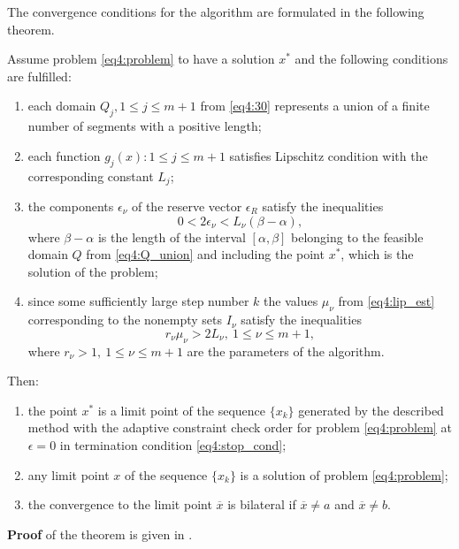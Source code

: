 The convergence conditions for the algorithm are formulated in the following theorem.

\begin{theorem}
Assume problem \eqref{eq4:problem} to have a solution $x^*$ and the following conditions are fulfilled:
\begin{enumerate}
  \item each domain $Q_j ,1\le j\le m+1$ from \eqref{eq4:30} represents a union of a finite number of segments with a positive length;
  \item each function $g_j(x): 1\le j\le m+1$ satisfies Lipschitz condition with the corresponding constant $L_j$;
  \item the components $\epsilon_\nu$ of the reserve vector $\epsilon_R$ satisfy the inequalities
  \begin{equation}
    \label{eq4:41}
    0<2\epsilon_\nu<L_\nu(\beta-\alpha),
  \end{equation}
  where $\beta-\alpha$ is the length of the interval $[\alpha,\beta]$ belonging to the feasible domain $Q$ from \eqref{eq4:Q_union} and including the point $x^*$, which is the solution of the problem;
  \item since some sufficiently large step number $k$ the values $\mu_\nu$ from \eqref{eq4:lip_est} corresponding to the nonempty sets $I_\nu$ satisfy the inequalities
  \begin{displaymath}
    r_\nu\mu_\nu>2L_\nu,\: 1\le\nu\le m+1,
  \end{displaymath}
  where $r_\nu>1,\: 1\le\nu\le m+1$ are the parameters of the algorithm.
\end{enumerate}

  Then:
  \begin{enumerate}
    \item the point $x^*$ is a limit point of the sequence $\{x_k\}$ generated by the described method with the adaptive constraint check order for problem \eqref{eq4:problem} at $\epsilon=0$ in termination condition \eqref{eq4:stop_cond};
    \item any limit point $x$ of the sequence $\{x_k\}$ is a solution of problem \eqref{eq4:problem};
    \item the convergence to the limit point $\overline x$ is bilateral if $\overline x\not= a$ and $\overline x\not=b$.
  \end{enumerate}
\end{theorem}

\textbf{Proof} of the theorem is given in \cite{SergeyevFamularoPugliese2001}.

